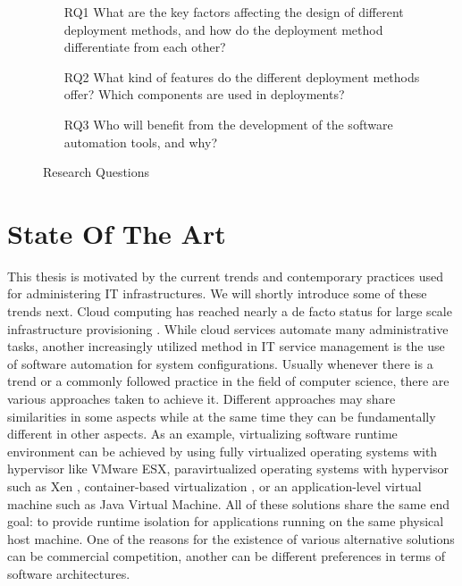 \begin{figure}[t]
\centering
\begin{itemize}
  \item [RQ1] What are the key factors affecting the design of different
              deployment methods, and how do the deployment method
              differentiate from each other?
  \item [RQ2] What kind of features do the different deployment methods offer?
              Which components are used in deployments?
  \item [RQ3] Who will benefit from the development of the software automation
              tools, and why?
\end{itemize}
\caption{Research Questions}
\label{fig:rqs}
\end{figure}

\chapter{State Of The Art} \label{state-of-the-art}

This thesis is motivated by the current trends and contemporary practices used
for administering IT infrastructures. We will shortly introduce some of these
trends next. Cloud computing has reached nearly a de facto status for large
scale infrastructure provisioning \cite{armbrust2010view}. While cloud services
automate many administrative tasks, another increasingly utilized method in IT
service management is the use of software automation for system configurations.
Usually whenever there is a trend or a commonly followed practice in the field
of computer science, there are various approaches taken to achieve it.
Different approaches may share similarities in some aspects while at the same
time they can be fundamentally different in other aspects. As an example,
virtualizing software runtime environment can be achieved by using fully
virtualized operating systems with hypervisor like VMware ESX, paravirtualized
operating systems with hypervisor such as Xen \cite{barham2003xen},
container-based virtualization \cite{soltesz2007container-based}, or an
application-level virtual machine such as Java Virtual Machine. All of these
solutions share the same end goal: to provide runtime isolation for
applications running on the same physical host machine. One of the reasons for
the existence of various alternative solutions can be commercial competition,
another can be different preferences in terms of software architectures.

